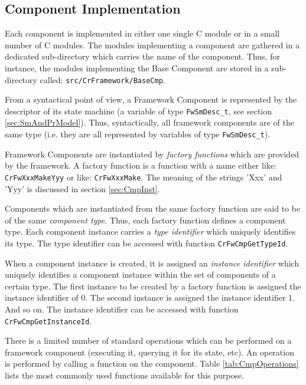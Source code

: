\documentclass[a4paper,10pt]{article}
\begin{document}
\subsection{Component Implementation}\label{sec:CmpImpl} 

Each component is implemented in either one single C module or in a small number of C modules. The modules implementing a component are gathered in a dedicated sub-directory which carries the name of the component. Thus, for instance, the modules implementing the Base Component are stored in a sub-directory called: \texttt{src/CrFramework/BaseCmp}.

From a syntactical point of view, a Framework Component is represented by the descriptor of its state machine (a variable of type \texttt{FwSmDesc\_t}, see section \ref{sec:SmAndPrModel}). Thus, syntactically, all framework components are of the same type (i.e. they are all represented by variables of type \texttt{FwSmDesc\_t}). 

Framework Components are instantiated by \textit{factory functions} which are provided by the framework. A factory function is a function with a name either like: \texttt{CrFwXxxMakeYyy} or like: \texttt{CrFwXxxMake}. The meaning of the strings 'Xxx' and 'Yyy' is discussed in section  \ref{sec:CmpInst}.

Components which are instantiated from the same factory function are said to be of the same \textit{component type}. Thus, each factory function defines a component type. Each component instance carries a \textit{type identifier} which uniquely identifies its type. The type identifier can be accessed with function \texttt{CrFwCmpGetTypeId}.

When a component instance is created, it is assigned an \textit{instance identifier} which uniquely identifies a component instance within the set of components of a certain type. The first instance to be created by a factory function is assigned the instance identifier of 0. The second instance is assigned the instance identifier 1. And so on. The instance identifier can be accessed with function \texttt{CrFwCmpGetInstanceId}.

There is a limited number of standard operations which can be performed on a framework component (executing it, querying it for its state, etc). An operation is performed by calling a function on the component. Table \ref{tab:CmpOperations} lists the most commonly used functions available for this purpose. 
\end{document}
